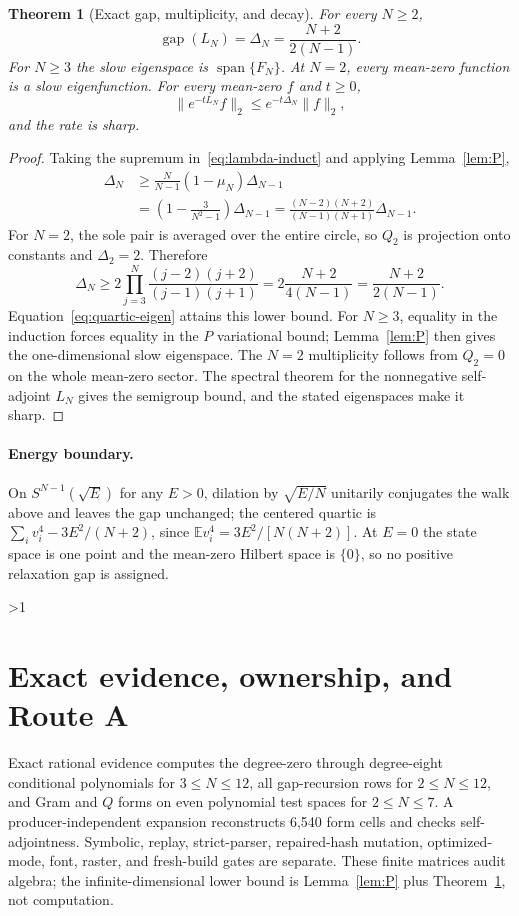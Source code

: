 \documentclass[9pt]{extarticle}
\newtheorem{theorem}{Theorem}
\newcommand{\E}{\mathbb E}
\begin{document}
\begin{theorem}[Exact gap, multiplicity, and decay]\label{thm:gap}
For every $N\geq2$,
\[
 \operatorname{gap}(L_N)=\Delta_N=\frac{N+2}{2(N-1)}.
\]
For $N\geq3$ the slow eigenspace is $\operatorname{span}\{F_N\}$.  At
$N=2$, every mean-zero function is a slow eigenfunction.  For every mean-zero
$f$ and $t\geq0$,
\[
 \|e^{-tL_N}f\|_2\leq e^{-t\Delta_N}\|f\|_2,
\]
and the rate is sharp.
\end{theorem}
\begin{proof}
Taking the supremum in~\eqref{eq:lambda-induct} and applying
Lemma~\ref{lem:P},
\begin{align*}
 \Delta_N&\geq\frac{N}{N-1}(1-\mu_N)\Delta_{N-1}\\
 &=\left(1-\frac3{N^2-1}\right)\Delta_{N-1}
 =\frac{(N-2)(N+2)}{(N-1)(N+1)}\Delta_{N-1}.
\end{align*}
For $N=2$, the sole pair is averaged over the entire circle, so $Q_2$ is
projection onto constants and $\Delta_2=2$.  Therefore
\[
 \Delta_N\geq2\prod_{j=3}^N
 \frac{(j-2)(j+2)}{(j-1)(j+1)}
 =2\frac{N+2}{4(N-1)}=\frac{N+2}{2(N-1)}.
\]
Equation~\eqref{eq:quartic-eigen} attains this lower bound.  For $N\geq3$,
equality in the induction forces equality in the $P$ variational bound;
Lemma~\ref{lem:P} then gives the one-dimensional slow eigenspace.  The
$N=2$ multiplicity follows from $Q_2=0$ on the whole mean-zero sector.  The
spectral theorem for the nonnegative self-adjoint $L_N$ gives the semigroup
bound, and the stated eigenspaces make it sharp.
\end{proof}

\paragraph{Energy boundary.}
On $S^{N-1}(\sqrt E)$ for any $E>0$, dilation by $\sqrt{E/N}$ unitarily
conjugates the walk above and leaves the gap unchanged; the centered quartic
is $\sum_i v_i^4-3E^2/(N+2)$, since
$\E v_i^4=3E^2/[N(N+2)]$.  At $E=0$ the state space is one point and the
mean-zero Hilbert space is $\{0\}$, so no positive relaxation gap is assigned.
\fi

\ifnum\CRevisionRound>1
\section{Exact evidence, ownership, and Route A}
Exact rational evidence computes the degree-zero through degree-eight
conditional polynomials for $3\leq N\leq12$, all gap-recursion rows for
$2\leq N\leq12$, and Gram and $Q$ forms on even polynomial test spaces for
$2\leq N\leq7$.  A producer-independent expansion reconstructs 6,540 form
cells and checks self-adjointness.  Symbolic, replay, strict-parser,
repaired-hash mutation, optimized-mode, font, raster, and fresh-build gates
are separate.  These finite matrices audit algebra; the infinite-dimensional
lower bound is Lemma~\ref{lem:P} plus Theorem~\ref{thm:gap}, not computation.
\end{document}
